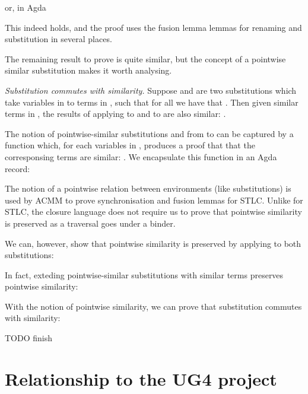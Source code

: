 \documentclass[bsc,frontabs,twoside,singlespacing,parskip,deptreport]{infthesis}
\theoremstyle{definition}
\begin{document}
or, in Agda


This indeed holds, and the proof uses the fusion lemma lemmas for
renaming and substitution in several places.

The remaining result to prove is quite similar, but the concept of a
pointwise similar substitution makes it worth analysing.

\textit{Substitution commutes with similarity.} Suppose  and 
are two 
substitutions which take variables  in  to terms in ,
such that for all  we have that . Then given similar terms  in , the results
of applying  to  and  to  are also
similar: .

The notion of pointwise-similar substitutions  and  from
 to 
can be captured by a function which, for each variables  in
, produces a proof that that the corresponsing terms are
similar: . We encapsulate this function
in an Agda record:


The notion of a pointwise relation between environments (like
substitutions) is used by ACMM to prove synchronisation and fusion
lemmas for STLC. Unlike for STLC, the closure language \lcl does not
require us to prove that pointwise similarity is preserved as a
traversal goes under a binder.

We can, however, show that pointwise similarity is preserved by
applying  to both substitutions:


In fact, exteding pointwise-similar substitutions with similar terms
preserves pointwise similarity:


With the notion of pointwise similarity, we can prove that
substitution commutes with similarity:


TODO finish

\chapter{Relationship to the UG4 project}
\end{document}
